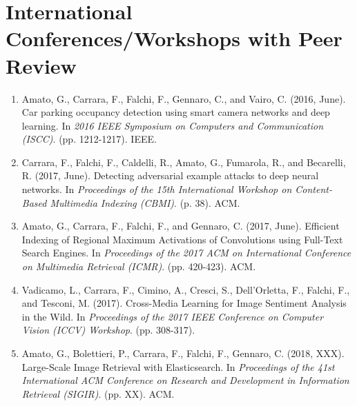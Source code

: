 \section*{International Conferences/Workshops with Peer Review}
\begin{enumerate}
    \item Amato, G., Carrara, F., Falchi, F., Gennaro, C., and Vairo, C. (2016, June). Car parking occupancy detection using smart camera networks and deep learning. In \emph{2016 IEEE Symposium on Computers and Communication (ISCC)}. (pp. 1212-1217). IEEE.
    \item Carrara, F., Falchi, F., Caldelli, R., Amato, G., Fumarola, R., and Becarelli, R. (2017, June). Detecting adversarial example attacks to deep neural networks. In \emph{Proceedings of the 15th International Workshop on Content-Based Multimedia Indexing (CBMI)}. (p. 38). ACM.
    \item Amato, G., Carrara, F., Falchi, F., and Gennaro, C. (2017, June). Efficient Indexing of Regional Maximum Activations of Convolutions using Full-Text Search Engines. In \emph{Proceedings of the 2017 ACM on International Conference on Multimedia Retrieval (ICMR)}. (pp. 420-423). ACM.
    \item Vadicamo, L., Carrara, F., Cimino, A., Cresci, S., Dell’Orletta, F., Falchi, F., and Tesconi, M. (2017). Cross-Media Learning for Image Sentiment Analysis in the Wild. In \emph{Proceedings of the 2017 IEEE Conference on Computer Vision (ICCV) Workshop}. (pp. 308-317).
    \item Amato, G., Bolettieri, P., Carrara, F., Falchi, F., Gennaro, C. (2018, XXX). Large-Scale Image Retrieval with Elasticsearch. In \emph{Proceedings of the 41st International ACM Conference on Research and Development in Information Retrieval (SIGIR)}. (pp. XX). ACM.
\end{enumerate}

